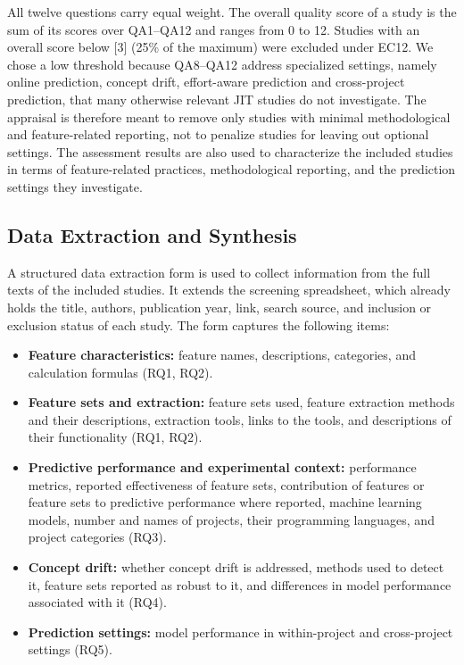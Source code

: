 \documentclass[sigconf,review]{acmart}
\newcommand{\tofill}[1]{{\color{red}[#1]}}
\begin{document}
All twelve questions carry equal weight. The overall quality score of a study is the sum of its scores over QA1--QA12 and ranges from 0 to 12. Studies with an overall score below \tofill{3} (25\% of the maximum) were excluded under EC12. We chose a low threshold because QA8--QA12 address specialized settings, namely online prediction, concept drift, effort-aware prediction and cross-project prediction, that many otherwise relevant JIT studies do not investigate. The appraisal is therefore meant to remove only studies with minimal methodological and feature-related reporting, not to penalize studies for leaving out optional settings. The assessment results are also used to characterize the included studies in terms of feature-related practices, methodological reporting, and the prediction settings they investigate.

\subsection{Data Extraction and Synthesis}
\label{subsec:data-extraction}

A structured data extraction form is used to collect information from the full texts of the included studies. It extends the screening spreadsheet, which already holds the title, authors, publication year, link, search source, and inclusion or exclusion status of each study. The form captures the following items:

\begin{itemize}
    \item \textbf{Feature characteristics:} feature names, descriptions, categories, and calculation formulas (RQ1, RQ2).
    \item \textbf{Feature sets and extraction:} feature sets used, feature extraction methods and their descriptions, extraction tools, links to the tools, and descriptions of their functionality (RQ1, RQ2).
    \item \textbf{Predictive performance and experimental context:} performance metrics, reported effectiveness of feature sets, contribution of features or feature sets to predictive performance where reported, machine learning models, number and names of projects, their programming languages, and project categories (RQ3).
    \item \textbf{Concept drift:} whether concept drift is addressed, methods used to detect it, feature sets reported as robust to it, and differences in model performance associated with it (RQ4).
    \item \textbf{Prediction settings:} model performance in within-project and cross-project settings (RQ5).
\end{itemize}
\end{document}
